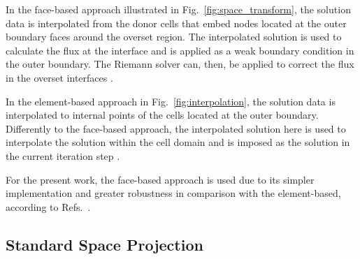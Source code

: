In the face-based approach illustrated in Fig.\ \ref{fig:space_transform}, the solution data is interpolated from the donor cells that embed nodes located at the outer boundary faces around the overset region. The interpolated solution is used to calculate the flux at the interface and is applied as a weak boundary condition in the outer boundary. The Riemann solver can, then, be applied to correct the flux in the overset interfaces \cite{Galbraith2013}.

In the element-based approach in Fig.\ \ref{fig:interpolation}, the solution data is interpolated to internal points of the cells located at the outer boundary. Differently to the face-based approach, the interpolated solution here is used to interpolate the solution within the cell domain and is imposed as the solution in the current iteration step \cite{Duan2019}.

For the present work, the face-based approach is used due to its simpler implementation and greater robustness in comparison with the element-based, according to Refs.\ \cite{Galbraith2013, DuanThesis2019}.

\subsection{Standard Space Projection}

